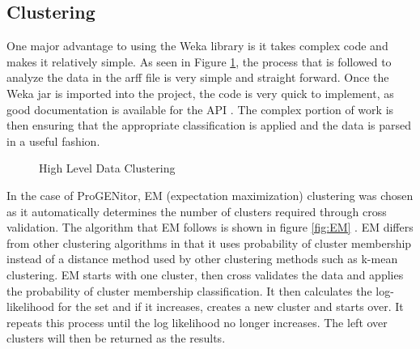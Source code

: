 \subsection{Clustering}
One major advantage to using the Weka library is it takes complex code and makes
it relatively simple.  As seen in Figure \ref{fig:clustering}, the process that is
followed to analyze the data in the arff file is very simple and straight
forward.  Once the Weka jar is imported into the project, the code is very quick
to implement, as good documentation is available for the API \cite{weka}.  The
complex portion of work is then ensuring that the appropriate classification is
applied and the data is parsed in a useful fashion.


\usetikzlibrary{shapes,arrows,chains}

\begin{figure}[H]
	\centering
	\caption{High Level Data Clustering}
	\label{fig:clustering}
\end{figure}

In the case of ProGENitor, EM (expectation maximization) clustering was chosen
as it automatically determines the number of clusters required through cross
validation.  The algorithm that EM follows is shown in figure
\ref{fig:EM} \cite{EM}.  EM differs from other clustering algorithms in that it
uses probability of cluster membership instead of a distance method used by
other clustering methods such as k-mean clustering.  EM starts with one cluster,
then cross validates the data and applies the probability of cluster membership
classification.  It then calculates the log-likelihood for the set and if it
increases, creates a new cluster and starts over.  It repeats this process until
the log likelihood no longer increases.  The left over clusters will then be
returned as the results.

